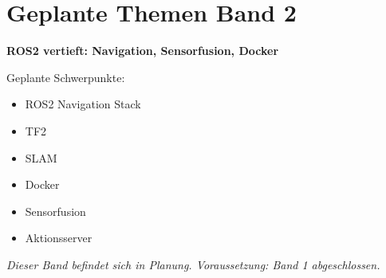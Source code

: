 \chapter*{Geplante Themen Band 2}

\textbf{ROS2 vertieft: Navigation, Sensorfusion, Docker}

\bigskip
Geplante Schwerpunkte:
\begin{itemize}
    \item ROS2 Navigation Stack
    \item TF2
    \item SLAM
    \item Docker
    \item Sensorfusion
    \item Aktionsserver
\end{itemize}

\bigskip
\textit{Dieser Band befindet sich in Planung. Voraussetzung: Band 1 abgeschlossen.}
